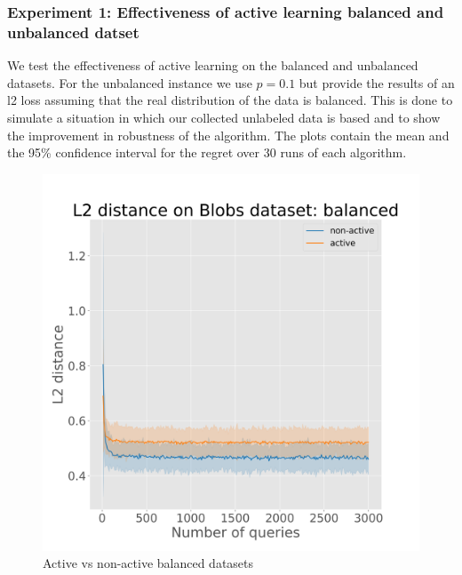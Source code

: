 \documentclass{article}
\begin{document}
\subsubsection{Experiment 1: Effectiveness of active learning balanced and unbalanced datset}
We test the effectiveness of active learning on the balanced and unbalanced datasets.
For the unbalanced instance we use $p = 0.1$ but provide the results of an l2 loss assuming that the real distribution of the data is balanced.
This is done to simulate a situation in which our collected unlabeled data is based and to show the improvement in robustness of the
algorithm. The plots contain the mean and the 95\% confidence interval for the regret over 30 runs of each algorithm.

\begin{figure}[!h]
  \centering
  \begin{minipage}{.45\textwidth}
    \centering
    \includegraphics[width=\linewidth]{active-vs-base-blobs-l2-loss_balanced-ci}
    \caption{Active vs non-active balanced datasets}\label{fig:linucb-blobs-regret-no-regime-change}
  \end{minipage}%
  \begin{minipage}{.45\textwidth}
    \centering

\end{minipage}
\end{figure}
\end{document}
